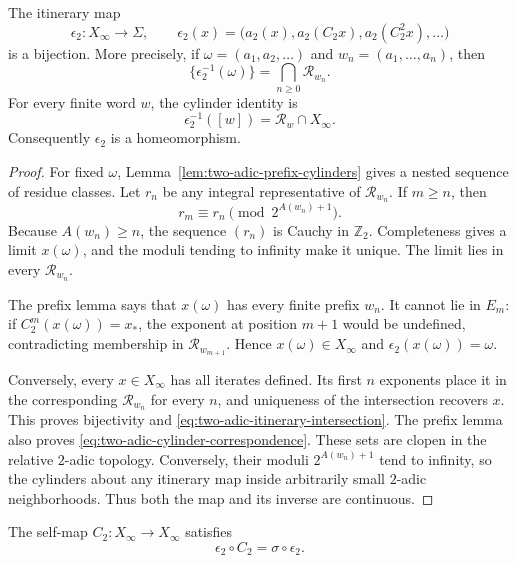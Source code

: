 \begin{theorem}
\label{thm:two-adic-survivor-coding}
The itinerary map
\[
 \epsilon_2:X_\infty\longrightarrow\Sigma,
 \qquad
 \epsilon_2(x)=
 \bigl(a_2(x),a_2(C_2x),a_2(C_2^2x),\ldots\bigr)
\]
is a bijection.  More precisely, if
$\omega=(a_1,a_2,\ldots)$ and $w_n=(a_1,\ldots,a_n)$, then
\begin{equation}
\label{eq:two-adic-itinerary-intersection}
 \{\epsilon_2^{-1}(\omega)\}
 =\bigcap_{n\geq0}\mathcal R_{w_n}.
\end{equation}
For every finite word $w$, the cylinder identity is
\begin{equation}
\label{eq:two-adic-cylinder-correspondence}
 \epsilon_2^{-1}([w])=\mathcal R_w\cap X_\infty.
\end{equation}
Consequently $\epsilon_2$ is a homeomorphism.
\end{theorem}

\begin{proof}
For fixed $\omega$, Lemma~\ref{lem:two-adic-prefix-cylinders} gives a nested
sequence of residue classes.  Let $r_n$ be any integral representative of
$\mathcal R_{w_n}$.  If $m\geq n$, then
\[
 r_m\equiv r_n\pmod{2^{A(w_n)+1}}.
\]
Because $A(w_n)\geq n$, the sequence $(r_n)$ is Cauchy in $\mathbb Z_2$.
Completeness gives a limit $x(\omega)$, and the moduli tending to infinity
make it unique.  The limit lies in every $\mathcal R_{w_n}$.

The prefix lemma says that $x(\omega)$ has every finite prefix $w_n$.
It cannot lie in $E_m$: if $C_2^m(x(\omega))=x_*$, the exponent at position
$m+1$ would be undefined, contradicting membership in
$\mathcal R_{w_{m+1}}$.  Hence $x(\omega)\in X_\infty$ and
$\epsilon_2(x(\omega))=\omega$.

Conversely, every $x\in X_\infty$ has all iterates defined.  Its first $n$
exponents place it in the corresponding $\mathcal R_{w_n}$ for every $n$,
and uniqueness of the intersection recovers $x$.  This proves bijectivity and
\eqref{eq:two-adic-itinerary-intersection}.  The prefix lemma also proves
\eqref{eq:two-adic-cylinder-correspondence}.  These sets are clopen in the
relative $2$-adic topology.  Conversely, their moduli
$2^{A(w_n)+1}$ tend to infinity, so the cylinders about any itinerary map
inside arbitrarily small $2$-adic neighborhoods.  Thus both the map and its
inverse are continuous.
\end{proof}

\begin{corollary}
\label{cor:two-adic-shift-conjugacy}
The self-map $C_2:X_\infty\to X_\infty$ satisfies
\[
 \epsilon_2\circ C_2=\sigma\circ\epsilon_2.
\]
\end{corollary}

